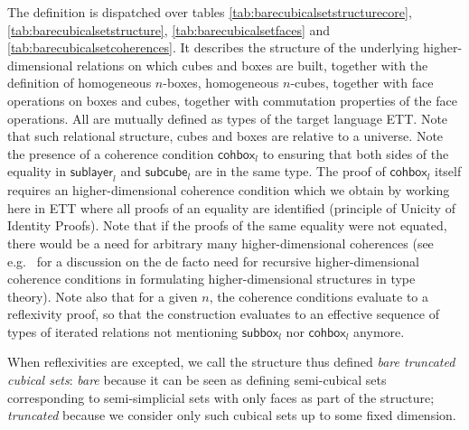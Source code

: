 \documentclass[10pt, titlepage]{amsart}
\newcommand{\sort}[1]{\ensuremath{\mathsf{U}_{#1}}}
\newcommand{\unittype}{\ensuremath{\mathsf{unit}}}
\newcommand{\defeq}{\ensuremath{\triangleq}}
\newcommand{\downbox}[2]{\ensuremath{\mathsf{subbox}_{#1}^{#2}}}
\newcommand{\downlayer}[2]{\ensuremath{\mathsf{sublayer}_{#1}^{#2}}}
\newcommand{\downcube}[2]{\ensuremath{\mathsf{subcube}_{#1}^{#2}}}
\newcommand{\myfullbox}[2]{\ensuremath{\mathsf{fullbox}_{#1}^{#2}}}
\newcommand{\cohbox}[2]{\ensuremath{\mathsf{cohbox}_{#1}^{#2}}}
\newcommand{\partialcubset}[2]{\ensuremath{\mathsf{cubset}_{#1}^{<#2}}}
\newcommand{\mycubsetcomp}[2]{\ensuremath{\mathsf{cubset}_{#1}^{=#2}}}
\newcommand{\imp}{\ensuremath{\rightarrow}}
\newcommand{\eqnline}[4]{$#1$ & $#2$ & $#3$ & $#4$ \\}
\newcommand{\mc}[1]{\multicolumn{4}{c}{\textit{#1}} \\\\}
\begin{document}
The definition is dispatched over tables \ref{tab:barecubicalsetstructurecore}, \ref{tab:barecubicalsetstructure}, \ref{tab:barecubicalsetfaces} and \ref{tab:barecubicalsetcoherences}. It describes the structure of the underlying higher-dimensional relations on which cubes and boxes are built, together with the definition of homogeneous $n$-boxes, homogeneous $n$-cubes, together with face operations on boxes and cubes, together with commutation properties of the face operations. All are mutually defined as types of the target language ETT. Note that such relational structure, cubes and boxes are relative to a universe. Note the presence of a coherence condition $\cohbox{l}{}$ to ensuring that both sides of the equality in $\downlayer{l}{}$ and $\downcube{l}{}$ are in the same type. The proof of $\cohbox{l}{}$ itself requires an higher-dimensional coherence condition which we obtain by working here in ETT where all proofs of an equality are identified (principle of Unicity of Identity Proofs). Note that if the proofs of the same equality were not equated, there would be a need for arbitrary many higher-dimensional coherences (see e.g.~\cite{Herbelin15} for a discussion on the de facto need for recursive higher-dimensional coherence conditions in formulating higher-dimensional structures in type theory). Note also that for a given $n$, the coherence conditions evaluate to a reflexivity proof, so that the construction evaluates to an effective sequence of types of iterated relations not mentioning $\downbox{l}{}$ nor $\cohbox{l}{}$ anymore.

When reflexivities are excepted, we call the structure thus defined \emph{bare truncated cubical sets}: \emph{bare} because it can be seen as defining semi-cubical sets corresponding to semi-simplicial sets with only faces as part of the structure; \emph{truncated} because we consider only such cubical sets up to some fixed dimension.

\end{document}
